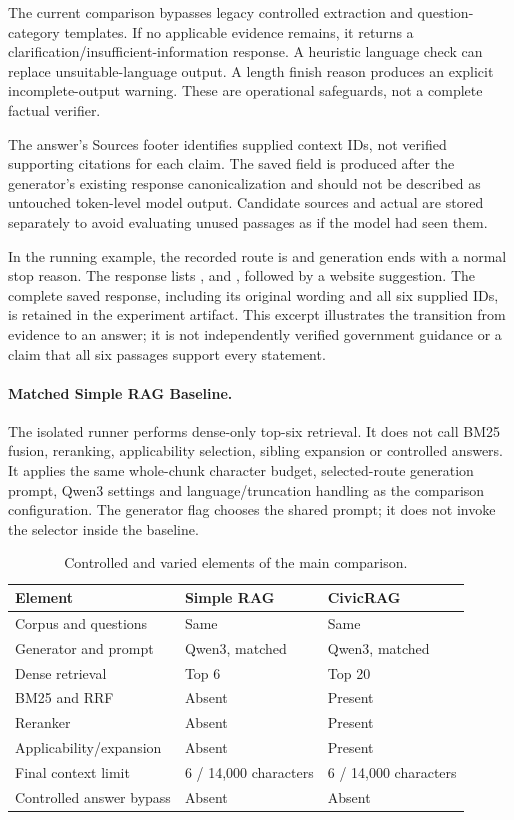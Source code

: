 The current comparison bypasses legacy controlled extraction and question-category templates. If no applicable evidence remains, it returns a clarification/insufficient-information response. A heuristic language check can replace unsuitable-language output. A length finish reason produces an explicit incomplete-output warning. These are operational safeguards, not a complete factual verifier.

The answer's Sources footer identifies supplied context IDs, not verified supporting citations for each claim. The saved  field is produced after the generator's existing response canonicalization and should not be described as untouched token-level model output. Candidate sources and actual  are stored separately to avoid evaluating unused passages as if the model had seen them.

In the running example, the recorded route is  and generation ends with a normal stop reason. The response lists ,  and , followed by a website suggestion. The complete saved response, including its original wording and all six supplied IDs, is retained in the experiment artifact. This excerpt illustrates the transition from evidence to an answer; it is not independently verified government guidance or a claim that all six passages support every statement.

\paragraph{Matched Simple RAG Baseline.}
The isolated runner  performs dense-only top-six retrieval. It does not call BM25 fusion, reranking, applicability selection, sibling expansion or controlled answers. It applies the same whole-chunk character budget, selected-route generation prompt, Qwen3 settings and language/truncation handling as the comparison configuration. The  generator flag chooses the shared prompt; it does not invoke the selector inside the baseline.

\begin{table}[htbp]\centering\small
\caption{Controlled and varied elements of the main comparison.}
\begin{tabularx}{\linewidth}{p{44mm}XX}\toprule
Element & Simple RAG & CivicRAG\\\midrule
Corpus and questions & Same & Same\\
Generator and prompt & Qwen3, matched & Qwen3, matched\\
Dense retrieval & Top 6 & Top 20\\
BM25 and RRF & Absent & Present\\
Reranker & Absent & Present\\
Applicability/expansion & Absent & Present\\
Final context limit & 6 / 14,000 characters & 6 / 14,000 characters\\
Controlled answer bypass & Absent & Absent\\\bottomrule
\end{tabularx}\end{table}

